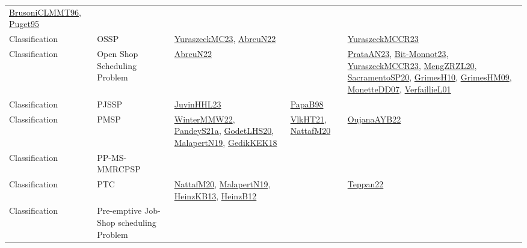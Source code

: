 {\begin{longtable}{lp{3cm}>{\raggedright}p{6cm}>{\raggedright}p{6cm}p{8cm}}
\href{papers/BrusoniCLMMT96.pdf}{BrusoniCLMMT96}\cite{BrusoniCLMMT96}, \href{papers/Puget95.pdf}{Puget95}\cite{Puget95}\\
Classification & OSSP & \href{papers/YuraszeckMC23.pdf}{YuraszeckMC23}\cite{YuraszeckMC23}, \href{articles/AbreuN22.pdf}{AbreuN22}\cite{AbreuN22} &  & \href{articles/YuraszeckMCCR23.pdf}{YuraszeckMCCR23}\cite{YuraszeckMCCR23}\\
Classification & Open Shop Scheduling Problem & \href{articles/AbreuN22.pdf}{AbreuN22}\cite{AbreuN22} &  & \href{articles/PrataAN23.pdf}{PrataAN23}\cite{PrataAN23}, \href{papers/Bit-Monnot23.pdf}{Bit-Monnot23}\cite{Bit-Monnot23}, \href{articles/YuraszeckMCCR23.pdf}{YuraszeckMCCR23}\cite{YuraszeckMCCR23}, \href{articles/MengZRZL20.pdf}{MengZRZL20}\cite{MengZRZL20}, \href{articles/SacramentoSP20.pdf}{SacramentoSP20}\cite{SacramentoSP20}, \href{papers/GrimesH10.pdf}{GrimesH10}\cite{GrimesH10}, \href{papers/GrimesHM09.pdf}{GrimesHM09}\cite{GrimesHM09}, \href{papers/MonetteDD07.pdf}{MonetteDD07}\cite{MonetteDD07}, \href{papers/VerfaillieL01.pdf}{VerfaillieL01}\cite{VerfaillieL01}\\
Classification & PJSSP & \href{papers/JuvinHHL23.pdf}{JuvinHHL23}\cite{JuvinHHL23} & \href{articles/PapaB98.pdf}{PapaB98}\cite{PapaB98} & \\
Classification & PMSP & \href{papers/WinterMMW22.pdf}{WinterMMW22}\cite{WinterMMW22}, \href{articles/PandeyS21a.pdf}{PandeyS21a}\cite{PandeyS21a}, \href{papers/GodetLHS20.pdf}{GodetLHS20}\cite{GodetLHS20}, \href{papers/MalapertN19.pdf}{MalapertN19}\cite{MalapertN19}, \href{articles/GedikKEK18.pdf}{GedikKEK18}\cite{GedikKEK18} & \href{articles/VlkHT21.pdf}{VlkHT21}\cite{VlkHT21}, \href{papers/NattafM20.pdf}{NattafM20}\cite{NattafM20} & \href{papers/OujanaAYB22.pdf}{OujanaAYB22}\cite{OujanaAYB22}\\
Classification & PP-MS-MMRCPSP &  &  & \\
Classification & PTC & \href{papers/NattafM20.pdf}{NattafM20}\cite{NattafM20}, \href{papers/MalapertN19.pdf}{MalapertN19}\cite{MalapertN19}, \href{papers/HeinzKB13.pdf}{HeinzKB13}\cite{HeinzKB13}, \href{papers/HeinzB12.pdf}{HeinzB12}\cite{HeinzB12} &  & \href{papers/Teppan22.pdf}{Teppan22}\cite{Teppan22}\\
Classification & Pre-emptive Job-Shop scheduling Problem &  &  & \\

\end{longtable}}
